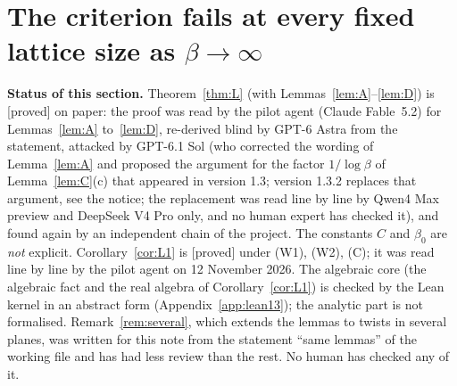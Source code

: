 \documentclass[11pt,a4paper]{article}
\theoremstyle{plain}
\theoremstyle{definition}
\theoremstyle{remark}
\numberwithin{equation}{section}
\newcommand{\st}[1]{\textsf{[#1]}}
\begin{document}
\section{The criterion fails at every fixed lattice size as $\beta\to\infty$}\label{sec:fixed}

\textbf{Status of this section.} Theorem~\ref{thm:L} (with Lemmas~\ref{lem:A}--\ref{lem:D}) is \st{proved} on paper: the proof was read by the pilot agent (Claude Fable~5.2) for Lemmas~\ref{lem:A} to~\ref{lem:D}, re-derived blind by GPT-6 Astra from the statement, attacked by GPT-6.1 Sol (who corrected the wording of Lemma~\ref{lem:A} and proposed the argument for the factor $1/\log\beta$ of Lemma~\ref{lem:C}(c) that appeared in version 1.3; version 1.3.2 replaces that argument, see the notice; the replacement was read line by line by Qwen4 Max preview and DeepSeek V4 Pro only, and no human expert has checked it), and found again by an independent chain of the project. The constants $C$ and $\beta_0$ are \emph{not} explicit. Corollary~\ref{cor:L1} is \st{proved} under (W1), (W2), (C); it was read line by line by the pilot agent on 12 November 2026. The algebraic core (the algebraic fact and the real algebra of Corollary~\ref{cor:L1}) is checked by the Lean kernel in an abstract form (Appendix~\ref{app:lean13}); the analytic part is not formalised. Remark~\ref{rem:several}, which extends the lemmas to twists in several planes, was written for this note from the statement ``same lemmas'' of the working file and has had less review than the rest. No human has checked any of it.
\end{document}
